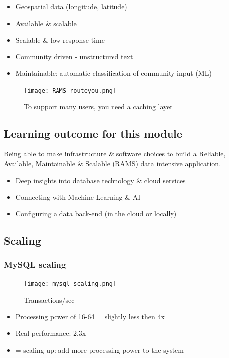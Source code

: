 \documentclass{article}
\begin{document}
\begin{itemize}
    \item Geospatial data (longitude, latitude)
    \item Available \& scalable
    \item Scalable \& low response time
    \item Community driven - unstructured text
    \item Maintainable: automatic classification of community input (ML)
\end{itemize}

\begin{figure}[H]
    \centering
    \texttt{[image: RAMS-routeyou.png]}
    \caption{To support many users, you need a caching layer}
\end{figure}


\subsection{Learning outcome for this module}

Being able to make infrastructure \& software choices to 
build a Reliable, Available, Maintainable \& Scalable (RAMS) 
data intensive application.

\begin{itemize}
    \item Deep insights into database technology \& cloud services
    \item Connecting with Machine Learning \& AI
    \item Configuring a data back-end (in the cloud or locally)
\end{itemize}


\subsection{Scaling}
\subsubsection{MySQL scaling}

\begin{figure}[H]
    \centering
    \texttt{[image: mysql-scaling.png]}
    \caption{Transactions/sec }
\end{figure}

\begin{itemize}
    \item Processing power of 16-64 = slightly less then 4x
    \item Real performance: 2.3x
    \item = scaling up: add more processing power to the system
\end{itemize}
\end{document}

